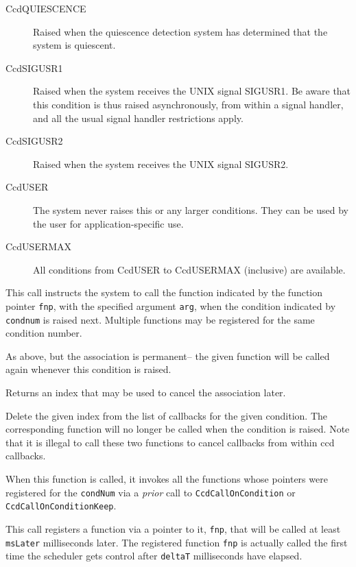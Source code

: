 \begin{description}
\item[CcdQUIESCENCE] Raised when the quiescence detection system
has determined that the system is quiescent.
\item[CcdSIGUSR1] Raised when the system receives the UNIX signal SIGUSR1.
Be aware that this condition is thus raised asynchronously, from
within a signal handler, and all the usual signal handler restrictions apply.
\item[CcdSIGUSR2] Raised when the system receives the UNIX signal SIGUSR2.
\item[CcdUSER] The system never raises this or any larger conditions.
They can be used by the user for application-specific use.
\item[CcdUSERMAX] All conditions from CcdUSER to CcdUSERMAX (inclusive) are available.
\end{description}


This call instructs the system to call the function indicated by the
function pointer {\tt fnp}, with the specified argument {\tt arg}, when the
condition indicated by {\tt condnum} is raised next. Multiple functions may
be registered for the same condition number.

As above, but the association is permanent-- the given function will
be called again whenever this condition is raised.

Returns an index that may be used to cancel the association later.

Delete the given index from the list of callbacks for
the given condition. The corresponding function will no longer be 
called when the condition is raised.
Note that it is illegal to call these two functions to cancel callbacks from within ccd callbacks.


When this function is called, it invokes all the functions whose
pointers were registered for the \verb#condNum# via a {\em prior} call
to {\tt CcdCallOnCondition} or {\tt CcdCallOnConditionKeep}.  


This call registers a function via a pointer to it, {\tt fnp},  that will be
called at least {\tt msLater} milliseconds later. 
The registered function {\tt fnp} is actually called the first time the
scheduler gets control after {\tt deltaT} milliseconds have elapsed. 

